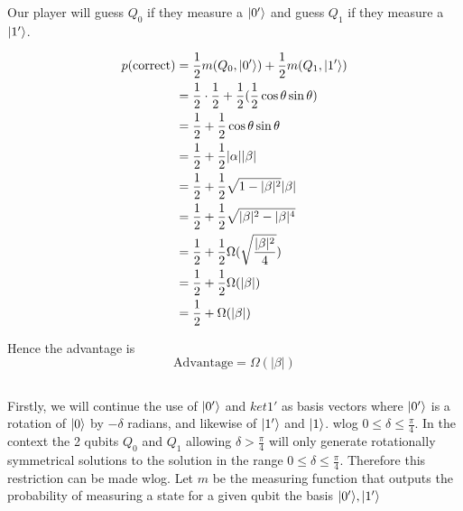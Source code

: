 Our player will guess $Q_0$ if they measure a $\lvert0'\rangle$ and guess $Q_1$ if they measure a $\lvert1'\rangle$.

\begin{align*}
    p(\text{correct}) &= \frac{1}{2} m(Q_0, \lvert0'\rangle) + \frac{1}{2} m(Q_1, \lvert1'\rangle)\\
     &= \frac{1}{2}\cdot \frac{1}{2} + \frac{1}{2} (\frac{1}{2} \cos\theta \sin\theta)\\
     &= \frac{1}{2} + \frac{1}{2} \cos\theta \sin\theta\\
     &= \frac{1}{2} + \frac{1}{2} |\alpha| |\beta|\\
     &= \frac{1}{2} + \frac{1}{2} \sqrt{1-|\beta|^2} |\beta|\\
     &= \frac{1}{2} + \frac{1}{2} \sqrt{|\beta|^2-|\beta|^4}\\
     &= \frac{1}{2} + \frac{1}{2} \Omega(\sqrt{\frac{|\beta|^2}{4}})\\
     &= \frac{1}{2} + \frac{1}{2} \Omega(|\beta|)\\
     &= \frac{1}{2} + \Omega(|\beta|)\\
\end{align*}

Hence the advantage is
\[
    \text{Advantage}=\Omega(|\beta|)
\]



\subsection{}
Firstly, we will continue the use of $\lvert0'\rangle$ and $ket{1'}$ as basis vectors where $\lvert0'\rangle$ is a rotation of $\lvert0\rangle$ by $-\delta$ radians, and likewise of $\lvert1'\rangle$ and $\lvert1\rangle$.
wlog $0 \leq \delta \leq \frac{\pi}{4}$.
In the context the 2 qubits $Q_0$ and $Q_1$ allowing $\delta>\frac{\pi}{4}$ will only generate rotationally symmetrical solutions to the solution in the range $0 \leq \delta \leq \frac{\pi}{4}$.
Therefore this restriction can be made wlog.
Let $m$ be the measuring function that outputs the probability of measuring a state for a given qubit the basis $\lvert0'\rangle, \lvert1'\rangle$ 

